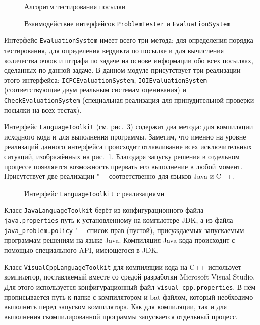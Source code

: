 \begin{figure}[!p]
\caption{Алгоритм тестирования посылки}
\label{activity_diagram_testing}
\end{figure}

\begin{figure}[!p]
\caption{Взаимодействие интерфейсов \texttt{ProblemTester} и \texttt{EvaluationSystem}}
\label{class_diagram_testing}
\end{figure}

Интерфейс \texttt{Evaluation\-System} имеет всего три метода: для определения порядка тестирования, для определения вердикта по посылке и для вычисления количества очков и штрафа по задаче на основе информации обо всех посылках, сделанных по данной задаче. В данном модуле присутствует три реализации этого интерфейса: \texttt{ICPC\-Evaluation\-System}, \texttt{IOI\-Evaluation\-System} (соответствующие двум реальным системам оценивания) и \texttt{Check\-Evaluation\-System} (специальная реализация для принудительной проверки посылки на всех тестах).

Интерфейс \texttt{Language\-Toolkit} (см. рис.~\ref{class_diagram_languages}) содержит два метода: для компиляции исходного кода и для выполнения программы. Заметим, что именно на уровне реализаций данного интерфейса происходит отлавливание всех исключительных ситуаций, изображённых на рис.~\ref{activity_diagram_testing}. Благодаря запуску решения в отдельном процессе появляется возможность прервать его выполнение в любой момент. Присутствует две реализации "--- соответственно для языков Java и C++.

\begin{figure}[h]
\caption{Интерфейс \texttt{LanguageToolkit} с реализациями}
\label{class_diagram_languages}
\end{figure}

Класс \texttt{Java\-Language\-Toolkit} берёт из конфигурационного файла \texttt{java.pro\-perties} путь к установленному на компьютере JDK, а из файла \texttt{java\_problem.po\-licy} "--- список прав (пустой), присуждаемых запускаемым программам-решениям на языке Java. Компиляция Java-кода происходит с помощью специального API, имеющегося в JDK.

Класс \texttt{Visual\-Cpp\-Language\-Toolkit} для компиляции кода на C++ использует компилятор, поставляемый вместе со средой разработки Microsoft Visual Studio. Для этого используется конфигурационный файл \texttt{visual\_cpp.properties}. В нём прописывается путь к папке с компилятором и bat-файлом, который необходимо выполнить перед запуском компилятора. Как для компиляции, так и для выполнения скомпилированной программы запускается отдельный процесс.

